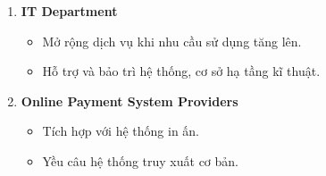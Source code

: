 \documentclass[a4paper]{article}
\begin{document}
\begin{enumerate}
\begin{itemize}
             \end{itemize}
         \item {\textbf{IT Department }}
         \begin{itemize}
            \item Mở rộng dịch vụ khi nhu cầu sử dụng tăng lên.
             \item Hỗ trợ và bảo trì hệ thống, cơ sở hạ tầng kĩ thuật.
             \end{itemize}
         \item {\textbf{Online Payment System Providers}}
         \begin{itemize}
             \item Tích hợp với hệ thống in ấn.
             \item Yều câu hệ thống truy xuất cơ bản.
         \end{itemize}
    \end{enumerate}



    
\end{document}
